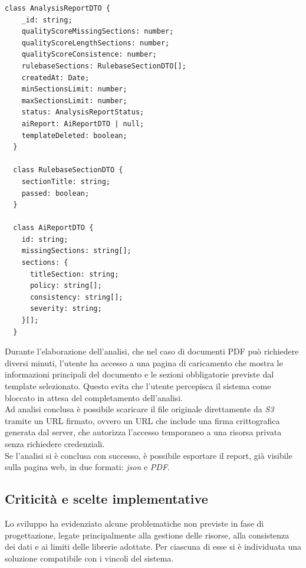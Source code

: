 \begin{lstlisting}[label={lst:report_view}]
  class AnalysisReportDTO {
    _id: string;
    qualityScoreMissingSections: number;
    qualityScoreLengthSections: number;
    qualityScoreConsistence: number;
    rulebaseSections: RulebaseSectionDTO[];
    createdAt: Date;
    minSectionsLimit: number;
    maxSectionsLimit: number;
    status: AnalysisReportStatus;
    aiReport: AiReportDTO | null;
    templateDeleted: boolean;
  }

  class RulebaseSectionDTO {
    sectionTitle: string;
    passed: boolean;
  }

  class AiReportDTO {
    id: string;
    missingSections: string[];
    sections: {
      titleSection: string;
      policy: string[];
      consistency: string[];
      severity: string;
    }[];
  }
\end{lstlisting}
\vspace{0.5cm}

Durante l'elaborazione dell'analisi, che nel caso di documenti PDF può richiedere diversi minuti, l'utente ha accesso a una pagina di caricamento che mostra le informazioni principali del documento e le sezioni obbligatorie previste dal template selezionato. Questo evita che l'utente percepisca il sistema come bloccato in attesa del completamento dell'analisi.\\

Ad analisi conclusa è possibile scaricare il file originale direttamente da \emph{S3} tramite un URL firmato, ovvero un URL che include una firma crittografica generata dal server, che autorizza l'accesso temporaneo a una risorsa privata senza richiedere credenziali.\\

Se l'analisi si è conclusa con successo, è possibile esportare il report, già visibile sulla pagina web, in due formati: \emph{json} e \emph{PDF}.

\subsection{Criticità e scelte implementative}
Lo sviluppo ha evidenziato alcune problematiche non previste in fase di progettazione, legate principalmente alla gestione delle risorse, alla consistenza dei dati e ai limiti delle librerie adottate. Per ciascuna di esse si è individuata una soluzione compatibile con i vincoli del sistema.

